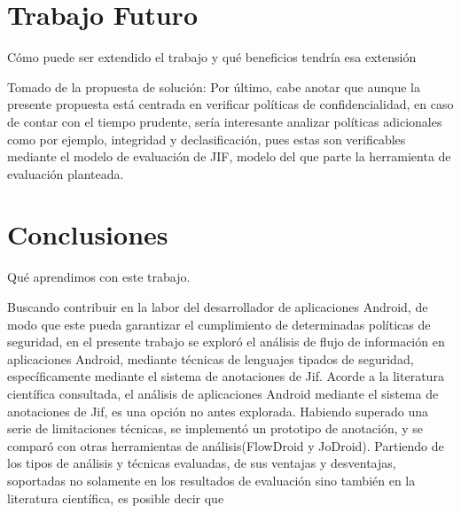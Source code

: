 \section{Trabajo Futuro}
Cómo puede ser extendido el trabajo y qué beneficios tendría esa
extensión\newline

Tomado de la propuesta de solución:\newline
Por último, cabe anotar que aunque la presente propuesta está centrada en
verificar políticas de confidencialidad, en caso de contar con el tiempo
prudente, sería interesante analizar políticas adicionales como por ejemplo,
integridad y declasificación, pues estas son verificables mediante el modelo de
evaluación de JIF, modelo del que parte la herramienta de evaluación planteada.

\section{Conclusiones}
Qué aprendimos con este trabajo.\newline

Buscando contribuir en la labor del desarrollador de aplicaciones Android, de
modo que este pueda garantizar el cumplimiento de determinadas políticas de
seguridad, en el presente trabajo se exploró el análisis de flujo de información
en aplicaciones Android, mediante técnicas de lenguajes tipados de seguridad,
específicamente mediante el sistema de anotaciones de Jif.\newline 
Acorde a la literatura científica consultada, el análisis de aplicaciones
Android mediante el sistema de anotaciones de Jif, es una opción no antes
explorada.\newline
Habiendo superado una serie de limitaciones técnicas, se implementó un
prototipo de anotación, y se comparó con otras herramientas de
análisis(FlowDroid y JoDroid).
Partiendo de los tipos de análisis y técnicas evaluadas, de sus ventajas y
desventajas, soportadas no solamente en los resultados de evaluación sino
también en la literatura científica, es posible decir que 




